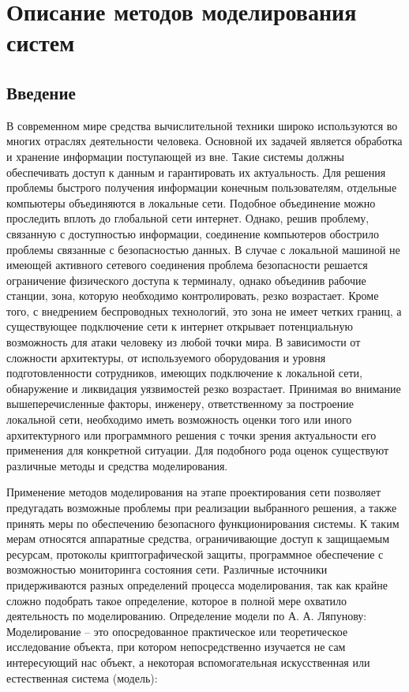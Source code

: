 \newpage

\chapter{Описание методов моделирования систем}
\section{Введение}

    В современном мире средства вычислительной техники широко используются во многих отраслях деятельности человека. Основной их задачей является обработка и хранение информации поступающей из вне. Такие системы должны обеспечивать доступ к данным и гарантировать их актуальность. Для решения проблемы быстрого получения информации конечным пользователям, отдельные компьютеры объединяются в локальные сети. Подобное объединение можно проследить вплоть до глобальной сети интернет. Однако, решив проблему, связанную с доступностью информации, соединение компьютеров обострило проблемы связанные с безопасностью данных. В случае с локальной машиной не имеющей активного сетевого соединения проблема безопасности решается ограничение физического доступа к терминалу, однако объединив рабочие станции, зона, которую необходимо контролировать, резко возрастает. Кроме того, с внедрением беспроводных технологий, это зона не имеет четких границ, а существующее подключение сети к интернет открывает потенциальную возможность для атаки человеку из любой точки мира. В зависимости от сложности архитектуры, от используемого оборудования и уровня подготовленности сотрудников, имеющих подключение к локальной сети, обнаружение и ликвидация уязвимостей резко возрастает. Принимая во внимание вышеперечисленные факторы, инженеру, ответственному за построение локальной сети, необходимо иметь возможность оценки того или иного архитектурного или программного решения с точки зрения актуальности его применения для конкретной ситуации. Для подобного рода оценок существуют различные методы и средства моделирования.

    Применение методов моделирования на этапе проектирования сети позволяет предугадать возможные проблемы при реализации выбранного решения, а также принять меры по обеспечению безопасного функционирования системы. К таким мерам относятся аппаратные средства, ограничивающие доступ к защищаемым ресурсам, протоколы криптографической защиты, программное обеспечение с возможностью мониторинга состояния сети. Различные источники придерживаются разных определений процесса моделирования, так как крайне сложно подобрать такое определение, которое в полной мере охватило деятельность по моделированию. Определение модели по А. А. Ляпунову: Моделирование – это опосредованное практическое или теоретическое исследование объекта, при котором непосредственно изучается не сам интересующий нас объект, а некоторая вспомогательная искусственная или естественная система (модель):

